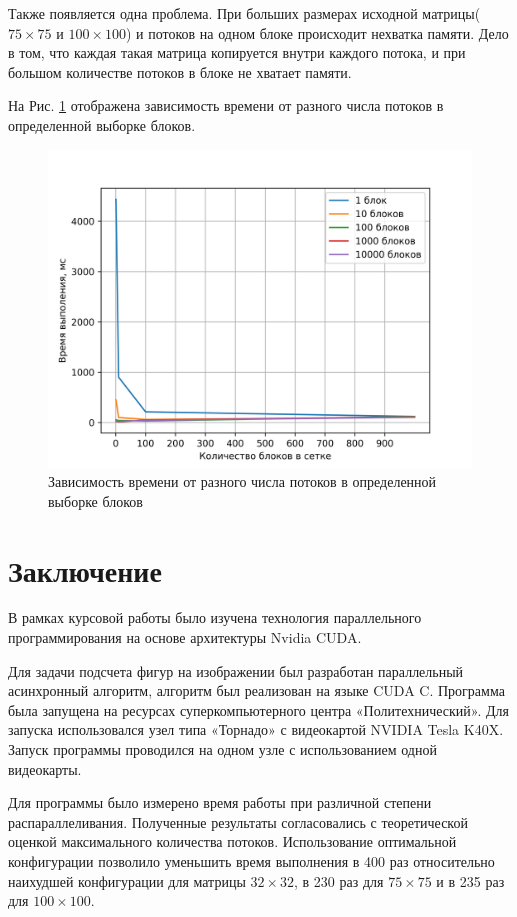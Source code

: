 \documentclass[a4paper, final]{article}
\begin{document}
Также появляется одна проблема. При больших размерах исходной матрицы($75 \times 75$ и $100 \times 100$) и потоков на одном блоке происходит нехватка памяти. Дело в том, что каждая такая матрица копируется внутри каждого потока, и при большом количестве потоков в блоке не хватает памяти.

На Рис. \ref{im4} отображена зависимость времени от разного числа потоков в определенной выборке блоков.

\begin{figure}[H]
   \centering
   \includegraphics[width=1.0\linewidth]{im4.png}
   \caption{Зависимость времени от разного числа потоков в определенной выборке блоков}
   \label{im4}
\end{figure}

\newpage
\section*{Заключение}
В рамках курсовой работы было изучена технология параллельного программирования
на основе архитектуры Nvidia CUDA.

Для задачи подсчета фигур на изображении был разработан параллельный асинхронный
алгоритм, алгоритм был реализован на языке CUDA C. Программа была запущена на
ресурсах суперкомпьютерного центра «Политехнический». Для запуска использовался
узел типа «Торнадо» с видеокартой NVIDIA Tesla K40X. Запуск программы проводился
на одном узле с использованием одной видеокарты.

Для программы было измерено время работы при различной степени распараллеливания. Полученные результаты согласовались с теоретической оценкой максимального
количества потоков. Использование оптимальной конфигурации позволило уменьшить
время выполнения в 400 раз относительно наихудшей конфигурации для матрицы $32 \times 32$, в 230 раз для $75 \times 75$ и в 235 раз для $100 \times 100$.
\end{document}

